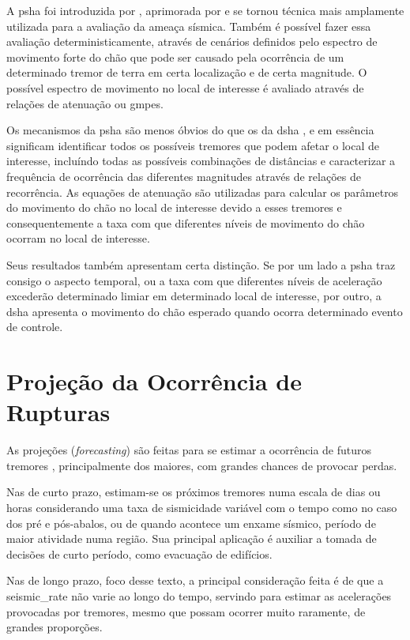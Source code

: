 A \glsdesc{psha} foi introduzida por \citet{cornell_1968}, aprimorada por \citet{mcguire_1976} e se tornou técnica mais
amplamente utilizada para a avaliação da ameaça sísmica. Também é possível fazer essa avaliação deterministicamente,
através de cenários definidos pelo espectro de movimento forte do chão que pode ser causado pela ocorrência de um
determinado tremor de terra em certa localização e de certa magnitude. O possível espectro de movimento no local de
interesse é avaliado através de relações de atenuação ou \glspl{gmpe}.

Os mecanismos da \gls{psha} \citep{bazzurro_1999, abrahamson_2006} são menos óbvios do que os da \gls{dsha}
\citep{reiter_1991, kramer_1996}, e em essência significam identificar todos os possíveis tremores que podem afetar o local de interesse,
incluíndo todas as possíveis combinações de distâncias e caracterizar a frequência de ocorrência das diferentes magnitudes através de relações de recorrência. As equações de
atenuação são utilizadas para calcular os parâmetros do movimento do chão no local de interesse devido a esses tremores
e consequentemente a taxa com que diferentes níveis de movimento do chão ocorram no local de interesse.

Seus resultados também apresentam certa distinção. Se por um lado a \gls{psha} traz consigo o aspecto
temporal, ou a taxa com que diferentes níveis de aceleração excederão determinado limiar em determinado local de interesse,
por outro, a \gls{dsha} apresenta o movimento do chão esperado quando ocorra determinado evento de controle.


\section{Projeção da Ocorrência de Rupturas}
\label{sec:projecao}

As projeções (\textit{forecasting}) são feitas para se estimar a ocorrência de futuros tremores
\citep{kagan_2000,marzocchi_2011}, principalmente dos maiores, com grandes chances de provocar perdas.

Nas de curto prazo, estimam-se os próximos tremores
numa escala de dias ou horas considerando uma taxa de sismicidade variável
com o tempo como no caso dos pré e pós-abalos, ou de quando
acontece um enxame sísmico, período de maior atividade numa região.
Sua principal aplicação é auxiliar a tomada de decisões de curto período,
como evacuação de edifícios.

Nas de longo prazo, foco desse texto, a principal consideração feita é de que a
\gls{seismic_rate} não varie ao longo do tempo, servindo para estimar as acelerações
provocadas por tremores, mesmo que possam ocorrer
muito raramente, de grandes proporções.

